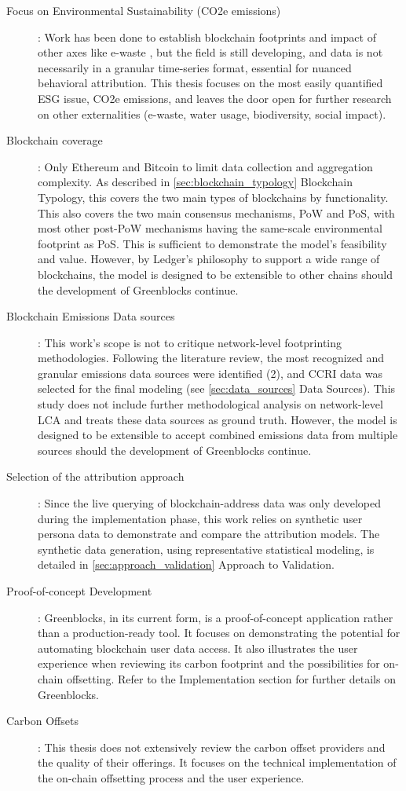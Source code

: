\documentclass[11pt]{report}
\begin{document}
\begin{description}
    \item [Focus on Environmental Sustainability (CO2e emissions)]: Work has been done to establish blockchain footprints and impact of other axes like e-waste \cite{devriesBitcoinGrowingEwaste2021}, but the field is still developing, and data is not necessarily in a granular time-series format, essential for nuanced behavioral attribution. This thesis focuses on the most easily quantified \ac{ESG} issue, CO2e emissions, and leaves the door open for further research on other externalities (e-waste, water usage, biodiversity, social impact).
    \item [Blockchain coverage]: Only Ethereum and Bitcoin to limit data collection and aggregation complexity. As described in \ref{sec:blockchain_typology} Blockchain Typology, this covers the two main types of blockchains by functionality. This also covers the two main consensus mechanisms, \ac{PoW} and \ac{PoS}, with most other post-PoW mechanisms having the same-scale environmental footprint as PoS. This is sufficient to demonstrate the model's feasibility and value. However, by Ledger's philosophy to support a wide range of blockchains, the model is designed to be extensible to other chains should the development of Greenblocks continue.
    \item [Blockchain Emissions Data sources]: This work's scope is not to critique network-level footprinting methodologies. Following the literature review, the most recognized and granular emissions data sources were identified (2), and \ac{CCRI} data was selected for the final modeling (see \ref{sec:data_sources} Data Sources). This study does not include further methodological analysis on network-level LCA and treats these data sources as ground truth. However, the model is designed to be extensible to accept combined emissions data from multiple sources should the development of Greenblocks continue.
    \item [Selection of the attribution approach]: Since the live querying of blockchain-address data was only developed during the implementation phase, this work relies on synthetic user persona data to demonstrate and compare the attribution models. The synthetic data generation, using representative statistical modeling, is detailed in \ref{sec:approach_validation} Approach to Validation.
    \item [Proof-of-concept Development]: Greenblocks, in its current form, is a proof-of-concept application rather than a production-ready tool. It focuses on demonstrating the potential for automating blockchain user data access. It also illustrates the user experience when reviewing its carbon footprint and the possibilities for on-chain offsetting. Refer to the Implementation section for further details on Greenblocks.
    \item [Carbon Offsets]: This thesis does not extensively review the carbon offset providers and the quality of their offerings. It focuses on the technical implementation of the on-chain offsetting process and the user experience.
\end{description}
\end{document}
